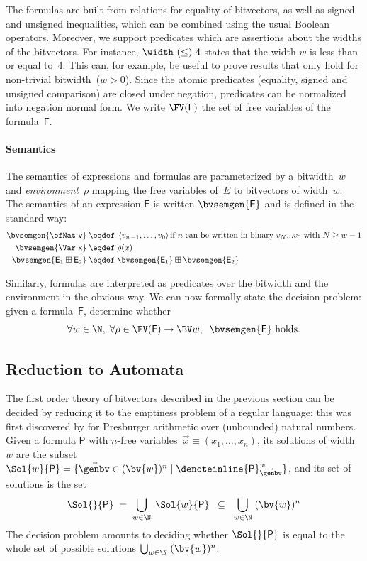 The formulas are built from relations for equality of bitvectors, as well as
signed and unsigned inequalities, which can be combined using the usual Boolean
operators.
%
Moreover, we support predicates which are assertions about the widths of the bitvectors.
For instance, $\width~{(\leq)}~4$ states that the width $w$
is less than or equal to~4. This can, for example, be useful to prove results
that only hold for non-trivial bitwidth~($w > 0$).
%
Since the atomic predicates (equality, signed and unsigned comparison) are
closed under negation, predicates can be normalized into negation normal form.
%
We write $\FV(\mathsf F)$ the set of free variables of the formula~$\mathsf F$.


\paragraph{Semantics}
The semantics of expressions and formulas are parameterized by a bitwidth~$w$
and \emph{environment}~$\rho$ mapping the free variables of~$E$ to bitvectors of width~$w$.
%
The semantics of an expression $\mathsf{E}$ is written $\bvsemgen{\mathsf{E}}$
and is defined in the standard way:
%
\begin{align*}
  \bvsemgen{\mathsf{\ofNat~v}} \;&\eqdef\; \left< v_{w-1}, \dots, v_0 \right>
  \text{if~$n$ can be written in binary $v_N...v_0$ with $N \geq w-1$}\\
  \bvsemgen{\mathsf{\Var~x}} \;&\eqdef\; \rho(x)\\
  \bvsemgen{\mathsf{E}_1 \boxplus \mathsf{E}_2} \;&\eqdef\;
    \bvsemgen{\mathsf{E}_1} \boxplus \bvsemgen{\mathsf{E}_2}
\end{align*}

\noindent
Similarly, formulas are interpreted as predicates over the bitwidth and the
environment in the obvious way.
%
We can now formally state the decision problem: given a formula~$\mathsf F$,
determine whether
\[
  \forall w \in \N,\; \forall \rho \in \FV(\mathsf F) \to \BV w,\;\; \bvsemgen{\mathsf F} \text{ holds}.
\]

\subsection{Reduction to Automata}
\label{sec:swbv:reduction-to-automata}

The first order theory of bitvectors described in the previous section can be
decided by reducing it to the emptiness problem of a regular language; this was
first discovered by \citet{Büchi1960} for Presburger arithmetic over (unbounded)
natural numbers.
%
Given a formula $\mathsf{P}$ with $n$-free variables~$\vec{x} \equiv (x_1, \dots, x_n)$,
its solutions of
width~$w$ are the subset $\Sol{w}{\mathsf{P}} = \{ \vec\genbv \in (\bv{w})^n \mid
\denoteinline{\mathsf{P}}^w_{\vec\genbv} \}$, and its set of solutions is the set
%
\[
  \Sol{}{\mathsf{P}} \;=\; \bigcup_{w \in \N}\; \Sol{w}{\mathsf{P}}
  \;\;\subseteq\;\;
  \bigcup_{w \in \N}\; (\bv{w})^n
\]
%
The decision problem amounts to deciding whether $\Sol{}{\mathsf{P}}$ is equal
to the whole set of possible solutions $\bigcup_{w \in \N}\; (\bv{w})^n$.

